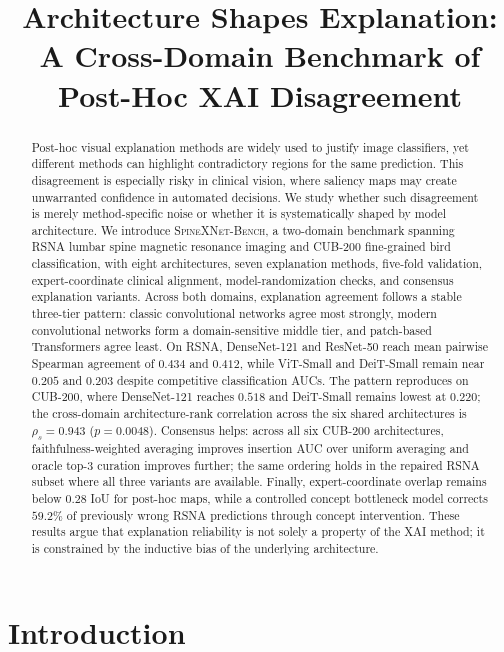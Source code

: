 \documentclass{bmvc2k}
\title{Architecture Shapes Explanation:\\
A Cross-Domain Benchmark of Post-Hoc XAI Disagreement}
\newcommand{\ours}{\textsc{SpineXNet-Bench}}
\begin{document}
\maketitle

\begin{abstract}
Post-hoc visual explanation methods are widely used to justify image classifiers, yet different methods can highlight contradictory regions for the same prediction. This disagreement is especially risky in clinical vision, where saliency maps may create unwarranted confidence in automated decisions. We study whether such disagreement is merely method-specific noise or whether it is systematically shaped by model architecture. We introduce \ours, a two-domain benchmark spanning RSNA lumbar spine magnetic resonance imaging and CUB-200 fine-grained bird classification, with eight architectures, seven explanation methods, five-fold validation, expert-coordinate clinical alignment, model-randomization checks, and consensus explanation variants. Across both domains, explanation agreement follows a stable three-tier pattern: classic convolutional networks agree most strongly, modern convolutional networks form a domain-sensitive middle tier, and patch-based Transformers agree least. On RSNA, DenseNet-121 and ResNet-50 reach mean pairwise Spearman agreement of $0.434$ and $0.412$, while ViT-Small and DeiT-Small remain near $0.205$ and $0.203$ despite competitive classification AUCs. The pattern reproduces on CUB-200, where DenseNet-121 reaches $0.518$ and DeiT-Small remains lowest at $0.220$; the cross-domain architecture-rank correlation across the six shared architectures is $\rho_s=0.943$ ($p=0.0048$). Consensus helps: across all six CUB-200 architectures, faithfulness-weighted averaging improves insertion AUC over uniform averaging and oracle top-$3$ curation improves further; the same ordering holds in the repaired RSNA subset where all three variants are available. Finally, expert-coordinate overlap remains below $0.28$ IoU for post-hoc maps, while a controlled concept bottleneck model corrects $59.2\%$ of previously wrong RSNA predictions through concept intervention. These results argue that explanation reliability is not solely a property of the XAI method; it is constrained by the inductive bias of the underlying architecture.
\end{abstract}

\section{Introduction}
\end{document}
